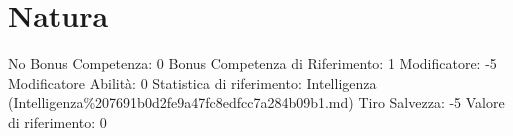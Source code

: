 \section{Natura}\label{natura}

\begin{description}
\tightlist
\item[Tags: ABI]
No Bonus Competenza: 0 Bonus Competenza di Riferimento: 1 Modificatore:
-5 Modificatore Abilità: 0 Statistica di riferimento: Intelligenza
(Intelligenza\%207691b0d2fe9a47fc8edfcc7a284b09b1.md) Tiro Salvezza: -5
Valore di riferimento: 0
\end{description}
